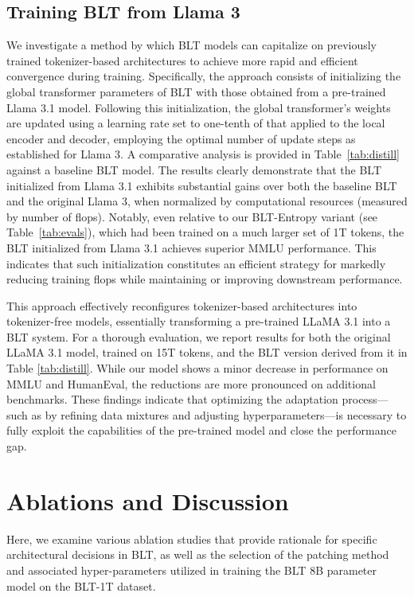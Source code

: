 \subsection{Training {\textsc BLT} from Llama 3}
\label{sec:distillation}
We investigate a method by which {\textsc BLT} models can capitalize on previously trained tokenizer-based architectures to achieve more rapid and efficient convergence during training. Specifically, the approach consists of initializing the global transformer parameters of {\textsc BLT} with those obtained from a pre-trained Llama 3.1 model. Following this initialization, the global transformer’s weights are updated using a learning rate set to one-tenth of that applied to the local encoder and decoder, employing the optimal number of update steps as established for Llama 3. A comparative analysis is provided in Table~\ref{tab:distill} against a baseline {\textsc BLT} model. The results clearly demonstrate that the {\textsc BLT} initialized from Llama 3.1 exhibits substantial gains over both the baseline {\textsc BLT} and the original Llama 3, when normalized by computational resources (measured by number of flops). Notably, even relative to our {\textsc BLT}-Entropy variant (see Table~\ref{tab:evals}), which had been trained on a much larger set of 1T tokens, the {\textsc BLT} initialized from Llama 3.1 achieves superior MMLU performance. This indicates that such initialization constitutes an efficient strategy for markedly reducing training flops while maintaining or improving downstream performance.

This approach effectively reconfigures tokenizer-based architectures into tokenizer-free models, essentially transforming a pre-trained LLaMA 3.1 into a {\textsc BLT} system. For a thorough evaluation, we report results for both the original LLaMA 3.1 model, trained on 15T tokens, and the {\textsc BLT} version derived from it in Table \ref{tab:distill}. While our model shows a minor decrease in performance on MMLU and HumanEval, the reductions are more pronounced on additional benchmarks. These findings indicate that optimizing the adaptation process—such as by refining data mixtures and adjusting hyperparameters—is necessary to fully exploit the capabilities of the pre-trained model and close the performance gap.

\section{Ablations and Discussion}
\label{section:ablations}
Here, we examine various ablation studies that provide rationale for specific architectural decisions in {\textsc BLT}, as well as the selection of the patching method and associated hyper-parameters utilized in training the {\textsc BLT} 8B parameter model on the {\textsc BLT}-1T dataset.

